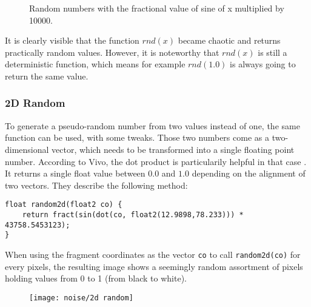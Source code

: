 \begin{figure}[H]
    \centering
    \caption{Random numbers with the fractional value of sine of x multiplied by 10000.}
\end{figure}

\noindent
It is clearly visible that the function $rnd(x)$ became chaotic and returns practically random values. However, it is noteworthy that $rnd(x)$ is still a deterministic function, which means for example $rnd(1.0)$ is always going to return the same value.

\clearpage
\subsubsection{2D Random}
To generate a pseudo-random number from two values instead of one, the same function can be used, with some tweaks. Those two numbers come as a two-dimensional vector, which needs to be transformed into a single floating point number.
According to Vivo, the dot product is particularily helpful in that case \cite{online:thebookofshaders}. It returns a single float value between $0.0$ and $1.0$ depending on the alignment of two vectors.
They describe the following method:

\begin{lstlisting}[language=HLSL, caption=Implementation of 2D random number generation., label=lst:random:2d]
float random2d(float2 co) {
    return fract(sin(dot(co, float2(12.9898,78.233))) * 43758.5453123);
}
\end{lstlisting}

\noindent
When using the fragment coordinates as the vector \lstinline[language=HLSL]{co} to call \lstinline[language=HLSL]{random2d(co)} for every pixels, the resulting image shows a seemingly random assortment of pixels holding values from 0 to 1 (from black to white).

\begin{figure}[H]
    \centering
            \texttt{[image: noise/2d random]}
            \label{img:noise:2d:random}
\end{figure}

